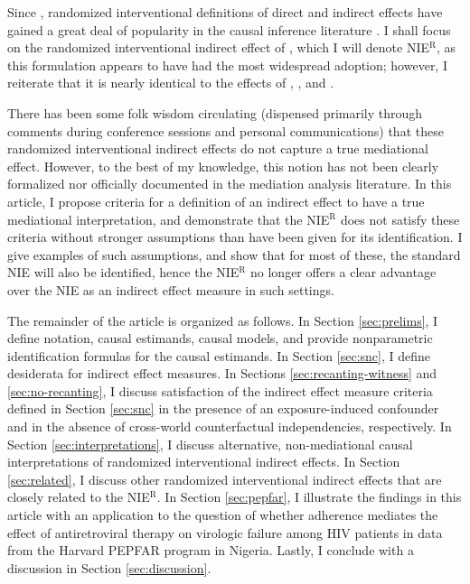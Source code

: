 \documentclass[12pt]{article}
\begin{document}
Since \cite{vanderweele2014effect}, randomized interventional definitions of direct and indirect effects have gained a great deal of popularity in the causal inference literature \citep{lok2016defining, lin2017interventional, %
vansteelandt2017interventional, %
vansteelandt2019mediation,mittinty2020longitudinal, diaz2021nonparametric, %
nguyen2021clarifying, %
xia2021identification, devick2022role, loh2022nonlinear, rudolph2022efficiently}. I shall focus on the randomized interventional indirect effect of \cite{vanderweele2014effect}, which I will denote NIE$^{\text{R}}$, as this formulation appears to have had the most widespread adoption; however, I reiterate that it is nearly identical to the effects of \cite{didelez2006direct}, \cite{geneletti2007identifying}, and \cite{van2008direct}.%

There has been some folk wisdom circulating (dispensed primarily through comments during conference sessions and personal communications) that these randomized interventional indirect effects do not capture a true mediational effect. However, to the best of my knowledge, this notion has not been clearly formalized nor officially documented in the mediation analysis literature. In this article, I propose %
criteria for a definition of an indirect effect to have a true mediational interpretation, and demonstrate that the NIE$^{\text{R}}$ does not satisfy these criteria without stronger assumptions than have been given for its identification. I give examples of such assumptions, and show that for most of these, the standard NIE will also be identified, hence the NIE$^{\text{R}}$ no longer offers a clear advantage over the NIE as an indirect effect measure in such settings.

The remainder of the article is organized as follows. In Section \ref{sec:prelims}, I define notation, causal estimands, causal models, and provide nonparametric identification formulas for the causal estimands. In Section \ref{sec:snc}, I define desiderata for indirect effect measures. %
In Sections \ref{sec:recanting-witness} and \ref{sec:no-recanting}, I discuss satisfaction of the indirect effect measure criteria defined in Section \ref{sec:snc} in the presence of an exposure-induced confounder and in the absence of cross-world counterfactual independencies, respectively. In Section \ref{sec:interpretations}, I discuss alternative, non-mediational causal interpretations of randomized interventional indirect effects. In Section \ref{sec:related}, I discuss other randomized interventional indirect effects that are closely related to the NIE$^{\text{R}}$. In Section \ref{sec:pepfar}, I illustrate the findings in this article with an application to the question of whether adherence mediates the effect of antiretroviral therapy on virologic failure among HIV patients in data from the Harvard PEPFAR program in Nigeria. Lastly, I conclude with a discussion in Section \ref{sec:discussion}.
\end{document}
